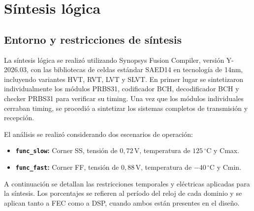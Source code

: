 \documentclass[10pt,a4paper]{article}
\begin{document}
\section{Síntesis lógica}
\label{sec:sintesis-logica}

\subsection{Entorno y restricciones de síntesis}

La síntesis lógica se realizó utilizando Synopsys Fusion Compiler,
versión Y-2026.03, con las bibliotecas de celdas estándar SAED14 en
tecnología de 14nm, incluyendo variantes HVT, RVT, LVT y SLVT. En 
primer lugar se  sintetizaron individualmente los módulos PRBS31, 
codificador BCH, decodificador BCH y checker PRBS31 para verificar 
su timing. Una vez que los módulos individuales cerraban timing, 
se procedió a sintetizar los sistemas completos de transmisión y 
recepción.

El análisis se realizó considerando dos escenarios de operación:

\begin{itemize}
    \item \textbf{\texttt{func\_slow}:}
    Corner SS, tensión de $0{,}72\,\mathrm{V}$,
    temperatura de $125\,{}^{\circ}\mathrm{C}$ y Cmax.

    \item \textbf{\texttt{func\_fast}:}
    Corner FF, tensión de $0{,}88\,\mathrm{V}$,
    temperatura de $-40\,{}^{\circ}\mathrm{C}$ y Cmin.
\end{itemize}

A continuación se detallan las restricciones temporales y eléctricas
aplicadas para la síntesis. Los porcentajes se refieren al período del
reloj de cada dominio y se aplican tanto a FEC como a DSP, cuando ambos
están presentes en el diseño.
\end{document}
